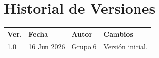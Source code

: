 \documentclass[11pt, a4paper]{article}
\begin{document}
\section{Historial de Versiones}

\begin{table}[h!]
\centering
\begin{tabularx}{\textwidth}{l l l X}
  \toprule
  \textbf{Ver.} & \textbf{Fecha} & \textbf{Autor} & \textbf{Cambios} \\
  \midrule
  1.0 & 16 Jun 2026 & Grupo 6 & Versión inicial. \\
  \bottomrule
\end{tabularx}
\end{table}
\end{document}
